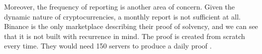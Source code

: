 Moreover, the frequency of reporting is another area of concern. Given the dynamic nature of cryptocurrencies, a monthly report is not sufficient at all.
Binance is the only marketplace describing their proof of solvency, and we can see that it is not built with recurrence in mind.
The proof is created from scratch every time. They would need 150 servers to produce a daily proof \cite{BPS}.

















